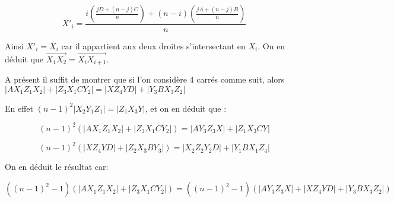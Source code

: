 \begin{sol}[66]
$$X'_i=\frac{i\left(\frac{jD+(n-j)C}{n}\right)+(n-i)\left(\frac{jA+(n-j)B}{n}\right)}{n}$$

Ainsi $X'_i=X_i$ car il appartient aux deux droites s'intersectant en $X_i$.
On en déduit que $\overrightarrow{X_1X_2}=\overrightarrow{X_iX_{i+1}}$.

A présent il suffit de montrer que si l'on consid\`ere 4 carrés comme suit, alors $|AX_1Z_1X_2|+|Z_3X_1CY_2|=|XZ_4YD|+|Y_3BX_3Z_2|$

En effet $(n-1)^2|X_2Y_1Z_1|=|Z_1X_3Y|$, et on en déduit que :

$$(n-1)^2(|AX_1Z_1X_2|+|Z_3X_1CY_2|)=|AY_3Z_3X|+|Z_1X_3CY|$$

$$(n-1)^2(|XZ_4YD|+|Z_2X_3BY_3|)=|X_2Z_2Y_2D|+|Y_1BX_1Z_4|$$

On en déduit le résultat car:


$$((n-1)^2-1)(|AX_1Z_1X_2|+|Z_3X_1CY_2|)=((n-1)^2-1)(|AY_3Z_3X|+|XZ_4YD|+|Y_3BX_3Z_2|)$$


\end{sol}
